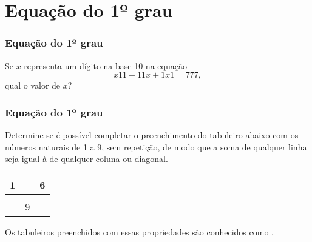 \section{Equação do 1º grau}
\begin{frame}
    \frametitle{Equação do 1º grau} 
    
    
    \begin{exemplo}
    Se $x$ representa um dígito na base 10 na equação $$x11 + 11x + 1x1
    = 777,$$ qual o valor de $x$?
    \end{exemplo}
    \end{frame}
    
    
    
    
    \begin{frame}
    \frametitle{Equação do 1º grau} 
    
    \begin{exemplo}
    Determine se é possível completar o preenchimento do tabuleiro
    abaixo com os números naturais de 1 a 9, sem repetição, de modo que
    a soma de qualquer linha seja igual à de qualquer coluna ou
    diagonal.
    
    \begin{center}
    \begin{tabular}{|c|c|c|}
        \hline
        1 &   & 6 \\ \hline
            &   &   \\ \hline
            & 9 &   \\
        \hline
    \end{tabular}
    \end{center}
    
    \end{exemplo}
    
    Os tabuleiros preenchidos com essas propriedades são conhecidos como
    .
    \end{frame}
    
    
    
    
